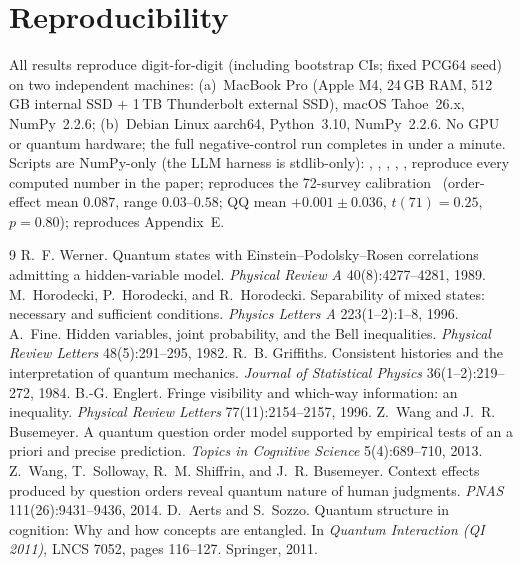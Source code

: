 \documentclass[11pt]{article}
\theoremstyle{definition}
\begin{document}
\section{Reproducibility}
All results reproduce digit-for-digit (including bootstrap CIs; fixed PCG64 seed) on two independent machines: (a)~MacBook Pro (Apple M4, 24\,GB RAM, 512\,GB internal SSD $+$ 1\,TB Thunderbolt external SSD), macOS Tahoe~26.x, NumPy~2.2.6; (b)~Debian Linux aarch64, Python~3.10, NumPy~2.2.6. No GPU or quantum hardware; the full negative-control run completes in under a minute. Scripts are NumPy-only (the LLM harness is stdlib-only): , , , , ,  reproduce every computed number in the paper;  reproduces the 72-survey calibration~\cite{wang2014} (order-effect mean $0.087$, range $0.03$--$0.58$; QQ mean \mbox{$+0.001\pm0.036$}, $t(71)=0.25$, $p=0.80$);  reproduces Appendix~E.

\begin{thebibliography}{9}
 R.~F. Werner. Quantum states with Einstein--Podolsky--Rosen correlations admitting a hidden-variable model. \emph{Physical Review A} 40(8):4277--4281, 1989.
 M.~Horodecki, P.~Horodecki, and R.~Horodecki. Separability of mixed states: necessary and sufficient conditions. \emph{Physics Letters A} 223(1--2):1--8, 1996.
 A.~Fine. Hidden variables, joint probability, and the Bell inequalities. \emph{Physical Review Letters} 48(5):291--295, 1982.
 R.~B. Griffiths. Consistent histories and the interpretation of quantum mechanics. \emph{Journal of Statistical Physics} 36(1--2):219--272, 1984.
 B.-G. Englert. Fringe visibility and which-way information: an inequality. \emph{Physical Review Letters} 77(11):2154--2157, 1996.
 Z.~Wang and J.~R. Busemeyer. A quantum question order model supported by empirical tests of an a priori and precise prediction. \emph{Topics in Cognitive Science} 5(4):689--710, 2013.
 Z.~Wang, T.~Solloway, R.~M. Shiffrin, and J.~R. Busemeyer. Context effects produced by question orders reveal quantum nature of human judgments. \emph{PNAS} 111(26):9431--9436, 2014.
 D.~Aerts and S.~Sozzo. Quantum structure in cognition: Why and how concepts are entangled. In \emph{Quantum Interaction (QI 2011)}, LNCS 7052, pages 116--127. Springer, 2011.
\end{thebibliography}
\end{document}
